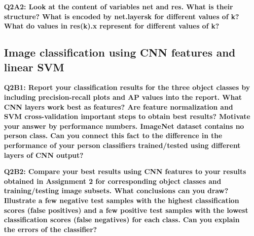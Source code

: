 \documentclass[a4paper,11pt]{exam}
\begin{document}
\textbf{Q2A2: Look at the content of variables net and res. What is their structure? What is encoded by net.layers{k} for different values of k? What do values in res(k).x represent for different values of k?}

\subsection{Image classification using CNN features and linear SVM}

\textbf{Q2B1: Report your classification results for the three object classes by including precision-recall plots and AP values into the report. What CNN layers work best as features? Are feature normalization and SVM cross-validation important steps to obtain best results? Motivate your answer by performance numbers. ImageNet dataset contains no person class. Can you connect this fact to the difference in the performance of your person classifiers trained/tested using different layers of CNN output?\\}

\textbf{Q2B2: Compare your best results using CNN features to your results obtained in Assignment 2 for corresponding object classes and training/testing image subsets. What conclusions can you draw? Illustrate a few negative test samples with the highest classification scores (false positives) and a few positive test samples with the lowest classification scores (false negatives) for each class. Can you explain the errors of the classifier?}







\end{document}

